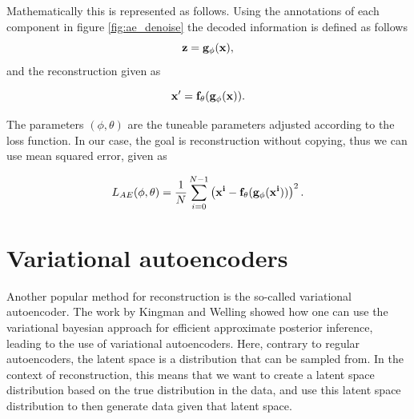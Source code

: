 Mathematically this is represented as follows\cite{weng2018VAE}. Using the annotations of each component in figure \ref{fig:ae_denoise} the decoded information is defined as follows 
\begin{equation*}
    \bf{z} = g_{\phi}(\bf{x}),
\end{equation*}    
and the reconstruction given as 

\begin{equation*}
    \bf{x'} = f_{\theta}(g_{\phi}(\bf{x})).
\end{equation*}  

The parameters $(\phi,\theta)$ are the tuneable parameters adjusted according to the loss function. In our case, the goal is
reconstruction without copying, thus we can use mean squared error, given as 

\begin{equation}\label{eq:loss_ae}
    L_{AE} (\phi,\theta) = \frac{1}{N}\sum_{i=0}^{N-1} \left(\bf{x}^{i} - f_{\theta}(g_{\phi}(\bf{x}^{i}))\right)^{2}.
\end{equation}

\section{Variational autoencoders}
Another popular method for reconstruction is the so-called variational autoencoder. The work by Kingman and Welling \cite{VAE} showed how
one can use the variational bayesian approach for efficient approximate posterior inference, leading to the use of variational autoencoders.
Here, contrary to regular autoencoders, the latent space is a distribution that can be sampled from. In the context of reconstruction, this means that
we want to create a latent space distribution based on the true distribution in the data, and use this latent space distribution to then generate
data given that latent space. 
